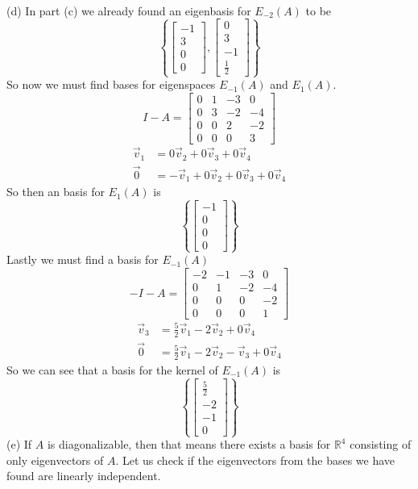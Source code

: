 \documentclass{report}
\begin{document}
\\
\noindent (d) In part (c) we already found an eigenbasis for $E_{-2}(A)$ to be
$$
\left\{
\begin{bmatrix}-1\\3\\0\\0\end{bmatrix},\begin{bmatrix}0\\3\\-1\\\frac{1}{2}\end{bmatrix}
\right\}
$$
So now we must find bases for eigenspaces $E_{-1}(A)$ and $E_{1}(A)$. 
$$
I - A = \begin{bmatrix}
0&1&-3&0\\
0&3&-2&-4\\
0&0&2&-2\\
0&0&0&3
\end{bmatrix}
$$
$$
\begin{aligned}
\vec{v}_1 &= 0\vec{v}_2 + 0\vec{v}_3 + 0\vec{v}_4 \\
\vec{0} &= -\vec{v}_1 + 0\vec{v}_2 + 0\vec{v}_3 + 0\vec{v}_4
\end{aligned}
$$
So then an basis for $E_1(A)$ is
$$
\left\{
\begin{bmatrix}-1\\0\\0\\0\end{bmatrix}
\right\}
$$
Lastly we must find a basis for $E_{-1}(A)$
$$
-I - A = \begin{bmatrix}
-2&-1&-3&0\\
0&1&-2&-4\\
0&0&0&-2\\
0&0&0&1
\end{bmatrix}
$$
$$
\begin{aligned}
\vec{v}_3 & = \frac{5}{2}\vec{v}_1 - 2 \vec{v}_2 + 0\vec{v}_4 \\
\vec{0} & = \frac{5}{2}\vec{v}_1 - 2 \vec{v}_2 - \vec{v}_3 + 0\vec{v}_4
\end{aligned}
$$
So we can see that a basis for the kernel of $E_{-1}(A)$ is
$$
\left\{
\begin{bmatrix}\frac{5}{2}\\-2\\-1\\0\end{bmatrix}
\right\}
$$
(e) If $A$ is diagonalizable,  then that means there exists a basis for $\mathbb{R}^4$ consisting of only eigenvectors of $A$.  Let us check if the eigenvectors from the bases we have found are linearly independent. 
\end{document}
